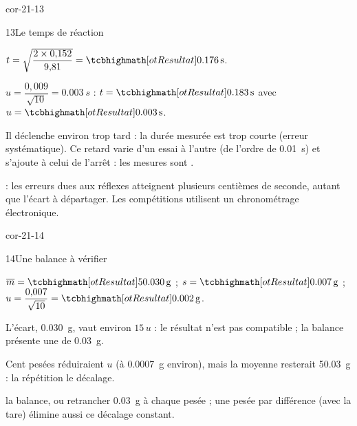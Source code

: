 \begin{blocLivre}{cor-21-13}
\begin{corrige}{13}{Le temps de réaction}
\begin{questions}
\item $t=\sqrt{\dfrac{2\times0{,}152}{9{,}81}}=\res{\qty{0,176}{s}}$.
\item $u=\dfrac{0{,}009}{\sqrt{10}}=\qty{0,003}{s}$ : $t=\res{\qty{0,183}{s}}$ avec $u=\res{\qty{0,003}{s}}$.
\item Il déclenche environ  trop tard : la durée mesurée est trop courte (erreur systématique). Ce retard varie d'un
essai à l'autre (de l'ordre de \qty{0,01}{s}) et s'ajoute à celui de l'arrêt : les mesures sont .
\item {} : les erreurs dues aux réflexes atteignent plusieurs centièmes de seconde, autant que l'écart à départager. Les
compétitions utilisent un chronométrage électronique.
\end{questions}
\end{corrige}
\end{blocLivre}
\begin{blocLivre}{cor-21-14}
\begin{corrige}{14}{Une balance à vérifier}
\begin{questions}
\item $\overline{m}=\res{\qty{50,030}{g}}$ ; $s=\res{\qty{0,007}{g}}$ ; $u=\dfrac{0{,}007}{\sqrt{10}}=\res{\qty{0,002}{g}}$.
\item L'écart, \qty{0,030}{g}, vaut environ $15\,u$ : le résultat n'est pas compatible ; la balance présente une  de
\qty{+0,03}{g}.
\item Cent pesées réduiraient $u$ (à \qty{0,0007}{g} environ), mais la moyenne resterait \qty{50,03}{g} : la répétition  le décalage.
\item {} la balance, ou retrancher \qty{0,03}{g} à chaque pesée ; une pesée par différence (avec la tare) élimine aussi ce
décalage constant.
\end{questions}
\end{corrige}
\end{blocLivre}
